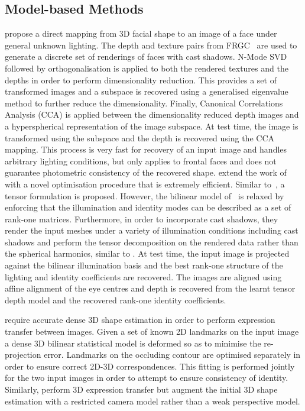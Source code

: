 \subsection{Model-based Methods}\label{subsec:bg_model_based_model}
\citet{minsik2013robust} propose a direct mapping from 3D facial shape to an
image of a face under general unknown lighting. The depth and texture pairs from
FRGC~\cite{phillips2005overview} are used to generate a discrete set of
renderings of faces with cast shadows. N-Mode
SVD~\cite{vasilescu2003multilinear} followed by orthogonalisation is applied to
both the rendered textures and the depths in order to perform dimensionality
reduction. This provides a set of transformed images and a subspace is recovered
using a generalised eigenvalue method to further reduce the dimensionality.
Finally, Canonical Correlations Analysis (CCA) is applied between the
dimensionality reduced depth images and a hyperspherical representation of the
image subspace. At test time, the image is transformed using the subspace and
the depth is recovered using the CCA mapping. This process is very fast for
recovery of an input image and handles arbitrary lighting conditions, but
only applies to frontal faces and does not guarantee photometric consistency
of the recovered shape.
\citet{minsik2014realtime} extend the work of \citet{minsik2011fast} with a
novel optimisation procedure that is extremely efficient. Similar
to~\cite{minsik2011fast}, a tensor formulation is proposed. However, the
bilinear model of~\cite{minsik2011fast} is relaxed by enforcing that the
illumination and identity modes can be described as a set of rank-one matrices.
Furthermore, in order to incorporate cast shadows, they render the input meshes
under a variety of illumination conditions including cast shadows and perform
the tensor decomposition on the rendered data rather than the spherical
harmonics, similar to \citet{minsik2013robust}. At test time, the input image
is projected against the bilinear illumination basis and the best rank-one
structure of the lighting and identity coefficients are recovered. The images
are aligned using affine alignment of the eye centres and depth is recovered
from the learnt tensor depth model and the recovered rank-one identity
coefficients.

\cite{Yang:2011gj} require accurate dense 3D shape estimation in order to
perform expression transfer between images. Given a set of known 2D landmarks on
the input image a dense 3D bilinear statistical model is deformed so as to
minimise the re-projection error. Landmarks on the occluding contour are
optimised separately in order to ensure correct 2D-3D correspondences. This
fitting is performed jointly for the two input images in order to attempt to
ensure consistency of identity.
Similarly, \citet{yang2012face} perform 3D expression transfer
but augment the initial 3D shape estimation with a restricted camera model
rather than a weak perspective model.

